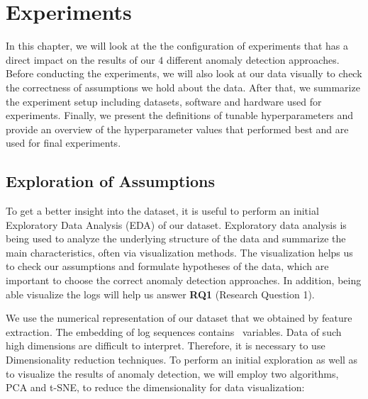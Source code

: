 \chapter{Experiments}
\label{chapter:experiments}

In this chapter, we will look at the the configuration of experiments that has a direct impact on the results of our $4$ different anomaly detection approaches. Before conducting the experiments, we will also look at our data visually to check the correctness of assumptions we hold about the data. After that, we summarize the experiment setup including datasets, software and hardware used for experiments.  Finally, we present the definitions of tunable hyperparameters and provide an overview of the hyperparameter values that performed best and are used for final experiments.

\section{Exploration of Assumptions}
To get a better insight into the dataset, it is useful to perform an initial Exploratory Data Analysis (EDA) \cite{eda} of our dataset. Exploratory data analysis is being used to analyze the underlying structure of the data and summarize the main characteristics, often via visualization methods. The visualization helps us to check our assumptions and formulate hypotheses of the data, which are important to choose the correct anomaly detection approaches. In addition, being able visualize the logs will help us answer \textbf{RQ1} (Research Question 1).

We use the numerical representation of our dataset that we obtained by feature extraction. The embedding of log sequences contains \featureVectorLength\ variables. Data of such high dimensions are difficult to interpret. Therefore, it is necessary to use Dimensionality reduction techniques. To perform an initial exploration as well as to visualize the results of anomaly detection, we will employ two algorithms, PCA and t-SNE, to reduce the dimensionality for data visualization:

